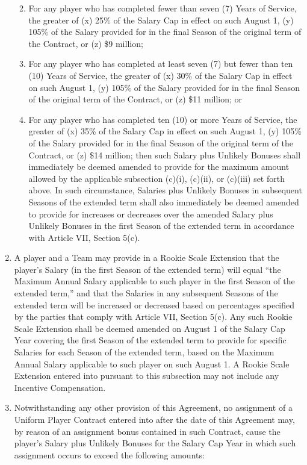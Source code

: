 \documentclass[
]{book}
\providecommand{\tightlist}{%
  \setlength{\itemsep}{0pt}\setlength{\parskip}{0pt}}
\begin{document}
\begin{enumerate}
  \begin{enumerate}
  \def\labelenumii{(\roman{enumii})}
  \tightlist
  \item
    For any player who has completed fewer than seven (7) Years of Service, the greater of (x) 25\% of the Salary Cap in effect on such August 1, (y) 105\% of the Salary provided for in the final Season of the original term of the Contract, or (z) \$9 million;
  \item
    For any player who has completed at least seven (7) but fewer than ten (10) Years of Service, the greater of (x) 30\% of the Salary Cap in effect on such August 1, (y) 105\% of the Salary provided for in the final Season of the original term of the Contract, or (z) \$11 million; or
  \item
    For any player who has completed ten (10) or more Years of Service, the greater of (x) 35\% of the Salary Cap in effect on such August 1, (y) 105\% of the Salary provided for in the final Season of the original term of the Contract, or (z) \$14 million; then such Salary plus Unlikely Bonuses shall immediately be deemed amended to provide for the maximum amount allowed by the applicable subsection (c)(i), (c)(ii), or (c)(iii) set forth above. In such circumstance, Salaries plus Unlikely Bonuses in subsequent Seasons of the extended term shall also immediately be deemed amended to provide for increases or decreases over the amended Salary plus Unlikely Bonuses in the first Season of the extended term in accordance with Article VII, Section 5(c).
  \end{enumerate}
\item
  A player and a Team may provide in a Rookie Scale Extension that the player's Salary (in the first Season of the extended term) will equal ``the Maximum Annual Salary applicable to such player in the first Season of the extended term,'' and that the Salaries in any subsequent Seasons of the extended term will be increased or decreased based on percentages specified by the parties that comply with Article VII, Section 5(c). Any such Rookie Scale Extension shall be deemed amended on August 1 of the Salary Cap Year covering the first Season of the extended term to provide for specific Salaries for each Season of the extended term, based on the Maximum Annual Salary applicable to such player on such August 1. A Rookie Scale Extension entered into pursuant to this subsection may not include any Incentive Compensation.
\item
  Notwithstanding any other provision of this Agreement, no assignment of a Uniform Player Contract entered into after the date of this Agreement may, by reason of an assignment bonus contained in such Contract, cause the player's Salary plus Unlikely Bonuses for the Salary Cap Year in which such assignment occurs to exceed the following amounts:


\end{enumerate}
\end{document}
